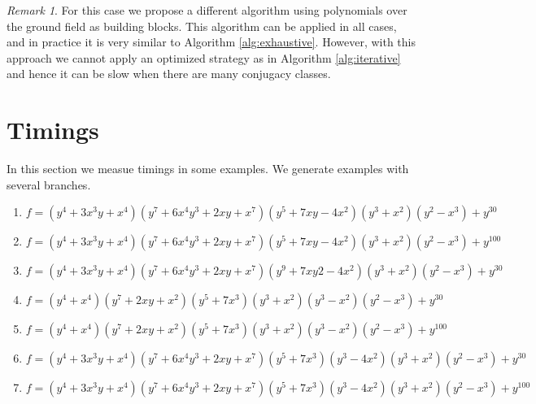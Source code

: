 \documentclass[a4paper,11pt]{amsart}%
\theoremstyle{definition}
\theoremstyle{plain}
\theoremstyle{remark}
\newtheorem{remark}[defn]{Remark}
\begin{document}
\begin{remark}
For this case we propose a different algorithm using polynomials over the ground field as building blocks.
This algorithm can be applied in all cases, and in practice it is very similar to Algorithm \ref{alg:exhaustive}. However, with this approach we cannot apply an optimized strategy as in Algorithm \ref{alg:iterative} and hence it can be slow when there are many conjugacy classes.
\end{remark}


\section{Timings}

In this section we measue timings in some examples. We generate examples with several branches.

\begin{enumerate}
\item \label{example:5branchesAdeg30}$f = (y^4+3x^3y + x^4)(y^7 + 6x^4y^3 + 2xy + x^7)(y^5+7xy-4x^2)(y^3+x^2)(y^2-x^3)+y^{30}$
\item \label{example:5branchesAdeg100}$f = (y^4+3x^3y + x^4)(y^7 + 6x^4y^3 + 2xy + x^7)(y^5+7xy-4x^2)(y^3+x^2)(y^2-x^3)+y^{100}$
\item \label{example:5branchesB} $f = (y^4+3x^3y + x^4)(y^7 + 6x^4y^3 + 2xy + x^7)(y^9+7xy2-4x^2)(y^3+x^2)(y^2-x^3)+y^{30}$
\item \label{example:6branchesAdeg30} $f = (y^4+ x^4)(y^7 + 2xy + x^2)(y^5+7x^3)(y^3+x^2)(y^3-x^2)(y^2-x^3)+y^{30}$
\item \label{example:6branchesAdeg100} $f = (y^4+ x^4)(y^7 + 2xy + x^2)(y^5+7x^3)(y^3+x^2)(y^3-x^2)(y^2-x^3)+y^{100}$
\item \label{example:6branchesBdeg30} $f = (y^4+3x^3y + x^4)(y^7 + 6x^4y^3 + 2xy + x^7)(y^5+7x^3)(y^3-4x^2)(y^3+x^2)(y^2-x^3)+y^{30}$
\item \label{example:6branchesBdeg100} $f = (y^4+3x^3y + x^4)(y^7 + 6x^4y^3 + 2xy + x^7)(y^5+7x^3)(y^3-4x^2)(y^3+x^2)(y^2-x^3)+y^{100}$

\end{enumerate}
\end{document}
